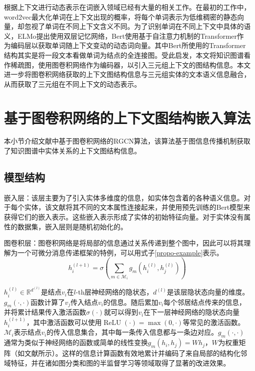 根据上下文进行动态表示在词嵌入领域已经有大量的相关工作。在最初的工作中，word2vec\cite{mikolov2013efficient}最大化单词在上下文出现的概率，将每个单词表示为低维稠密的静态向量，却忽视了单词在不同上下文含义不同。为了识别单词在不同上下文中具体的语义，ELMo\cite{peters2018deep}提出使用双层记忆网络，Bert\cite{devlin2018bert}使用基于自注意力机制的Transformer\cite{vaswani2017attention}作为编码层以获取单词随上下文变动的动态词向量。其中Bert所使用的Transformer结构其实是将一段文本看做单词为结点的全连接图。受此启发，本文将知识图谱看作稀疏图，使用图卷积网络作为编码器，以引入三元组上下文的图结构信息。本文进一步将图卷积网络获取的上下文图结构信息与三元组实体的文本语义信息融合，从而获取了三元组在不同上下文的动态表示。



\section{基于图卷积网络的上下文图结构嵌入算法}\label{RGCN}
本小节介绍文献\parencite{schlichtkrull2018modeling}中基于图卷积网络的RGCN算法，该算法基于图信息传播机制获取了知识图谱中实体关系的上下文图结构信息。
\subsection{模型结构}
嵌入层：该层主要为了引入实体多维度的信息，如实体包含着的各种语义信息。对于每个实体，该文献将其不同的文本属性连接起来，并使用预先训练的Bert模型来获得它们的嵌入表示。这些嵌入表示形成了实体的初始特征向量。对于实体没有属性的数据集，嵌入层则是随机初始化的。

图卷积层：图卷积网络是将局部的信息通过关系传递到整个图中，因此可以将其理解为一个可微分消息传递框架的特例，可以用式子\ref{propo-example}表示。
\begin{equation}
    h_{i}^{(l+1)}=\sigma\left(\sum_{m \in \mathcal{M}_{i}} g_{m}\left(h_{i}^{(l)}, h_{j}^{(l)}\right)\right)
    \label{propo-example}
\end{equation}

$h_{i}^{(l)} \in \mathbb{R}^{d^{(l)}}$是结点$v_{i}$在$l$-th层神经网络的隐状态，$d^{(l)}$是该层隐状态向量的维度。$g_{m}(\cdot, \cdot)$函数计算了$v_{j}$传入结点$v_{i}$的信息。随后累加$v_{i}$每个邻居结点传来的信息，并将累计结果传入激活函数$\sigma(\cdot)$就可以得到$v_{i}$在下一层神经网络的隐状态向量$h_{i}^{(l+1)}$，其中激活函数可以使用$\operatorname{ReLU}(\cdot)=\max (0, \cdot)$等常见的激活函数。$\mathcal{M}_{i}$表示结点$v_{i}$的传入信息集合，其中每一条传入信息都与一条边对应。$g_{m}(\cdot, \cdot)$通常为类似于神经网络的函数或简单的线性变换$g_{m}\left(h_{i}, h_{j}\right)=W h_{j}$，$W$为权重矩阵（如文献\parencite{kipf2016semi}所示）。这样的信息计算函数有效地累计并编码了来自局部的结构化邻域特征，并在诸如图分类\parencite{duvenaud2015convolutional}和图的半监督学习等领域取得了显著的改进效果。


